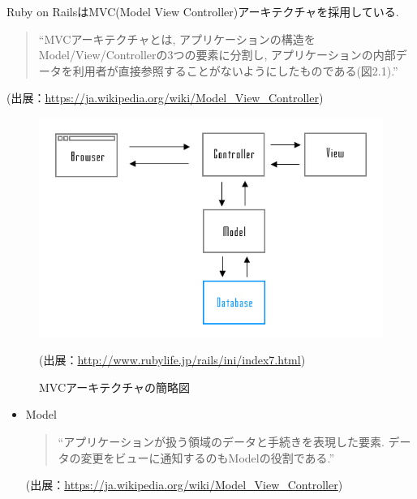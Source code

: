 \begin{description}
Ruby on RailsはMVC(Model View Controller)アーキテクチャを採用している.

\begin{quotation}
\begin{screen}
“MVCアーキテクチャとは, アプリケーションの構造をModel/View/Controllerの3つの要素に分割し, アプリケーションの内部データを利用者が直接参照することがないようにしたものである(図2.1).”
\end{screen}
\end{quotation}
\begin{flushright}
(出展：\url{https://ja.wikipedia.org/wiki/Model_View_Controller})
\end{flushright}

\begin{figure}
\begin{center}
\includegraphics[width=13cm]{fig/mvc.png}
\caption{MVCアーキテクチャの簡略図}
\end{center}
\begin{flushright}
(出展：\url{http://www.rubylife.jp/rails/ini/index7.html})
\end{flushright}
\end{figure}

\newpage

\begin{itemize}
\item Model

\begin{quotation}
\begin{screen}
“アプリケーションが扱う領域のデータと手続きを表現した要素.
データの変更をビューに通知するのもModelの役割である.”
\end{screen}
\end{quotation}
\begin{flushright}
(出展：\url{https://ja.wikipedia.org/wiki/Model_View_Controller})
\end{flushright}


\end{itemize}
\end{description}
